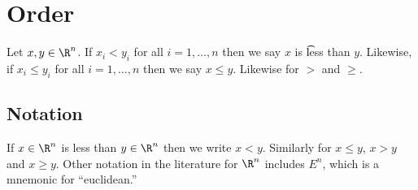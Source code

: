 \section*{Order}

Let $x, y \in \R ^n$.
If $x_i < y_i$ for all $i = 1, \dots , n$ then we say $x$ is \t{less than} $y$.
Likewise, if $x_i \leq y_i$ for all $i = 1, \dots , n$ then we say $x \leq y$.
Likewise for $>$ and $\geq$.

\subsection*{Notation}

If $x \in \R ^n$ is less than $y \in \R ^n$ then we write $x < y$.
Similarly for $x \leq y$, $x > y$ and $x \geq y$.
Other notation in the literature for $\R ^n$ includes $E^n$, which is a mnemonic for ``euclidean.''
